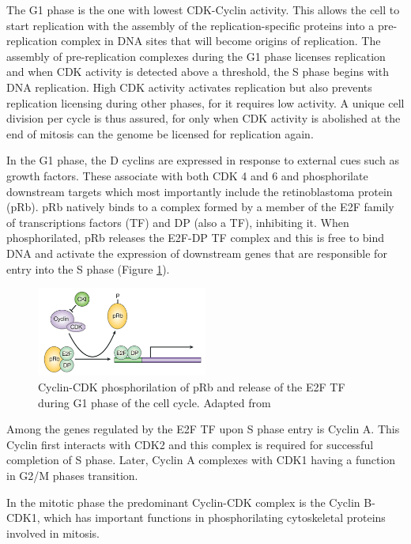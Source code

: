 \documentclass[11pt,twoside,a4paper]{report}
\begin{document}
				The G1 phase is the one with lowest CDK-Cyclin activity. This allows the cell to start replication with the assembly of the replication-specific proteins into a pre-replication complex in DNA sites that will become origins of replication. The assembly of pre-replication complexes during the G1 phase licenses replication and when CDK activity is detected above a threshold, the S phase begins with DNA replication. High CDK activity activates replication but also prevents replication licensing during other phases, for it requires low activity. A unique cell division per cycle is thus assured, for only when CDK activity is abolished at the end of mitosis can the genome be licensed for replication again.
								
				In the G1 phase, the D cyclins are expressed in response to external cues such as growth factors. These associate with both CDK 4 and 6 and phosphorilate downstream targets which most importantly include the retinoblastoma protein (pRb). pRb natively binds to a complex formed by a member of the E2F family of transcriptions factors (TF) and DP (also a TF), inhibiting it. When phosphorilated, pRb releases the E2F-DP TF complex and this is free to bind DNA and activate the expression of downstream genes that are responsible for entry into the S phase (Figure \ref{fig:pRb-E2F}).
				
				\begin{figure}[here]
					\centering
					\includegraphics[width=0.5\textwidth]{pngs/CDK-pRb-E2F-DP.png}
					\caption{Cyclin-CDK phosphorilation of pRb and release of the E2F TF during G1 phase of the cell cycle. {\footnotesize Adapted from \cite{Frisch2002}}}
					\label{fig:pRb-E2F}
				\end{figure}
				
				Among the genes regulated by the E2F TF upon S phase entry is Cyclin A. This Cyclin first interacts with CDK2 and this complex is required for successful completion of S phase. Later, Cyclin A complexes with CDK1 having a function in G2/M phases transition.
				
				In the mitotic phase the predominant Cyclin-CDK complex is the Cyclin B-CDK1, which has important functions in phosphorilating cytoskeletal proteins involved in mitosis.
				
\end{document}
